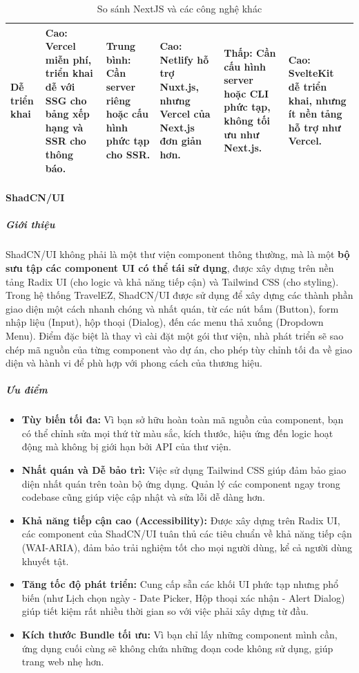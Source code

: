 \begin{landscape}
\begin{table}[h!]
\begin{tabularx}{\linewidth}{|l|X|X|X|X|X|}
\hline
\textbf{Dễ triển khai} & Cao: Vercel miễn phí, triển khai dễ với SSG cho bảng xếp hạng và SSR cho thông báo. & Trung bình: Cần server riêng hoặc cấu hình phức tạp cho SSR. & Cao: Netlify hỗ trợ Nuxt.js, nhưng Vercel của Next.js đơn giản hơn. & Thấp: Cần cấu hình server hoặc CLI phức tạp, không tối ưu như Next.js. & Cao: SvelteKit dễ triển khai, nhưng ít nền tảng hỗ trợ như Vercel. \\
\hline
\end{tabularx}
\caption{So sánh NextJS và các công nghệ khác}
\end{table}
\end{landscape}

\paragraph{ShadCN/UI}

\subparagraph{Giới thiệu}
ShadCN/UI không phải là một thư viện component thông thường, mà là một \textbf{bộ sưu tập các component UI có thể tái sử dụng}, được xây dựng trên nền tảng Radix UI (cho logic và khả năng tiếp cận) và Tailwind CSS (cho styling). Trong hệ thống TravelEZ, ShadCN/UI được sử dụng để xây dựng các thành phần giao diện một cách nhanh chóng và nhất quán, từ các nút bấm (Button), form nhập liệu (Input), hộp thoại (Dialog), đến các menu thả xuống (Dropdown Menu). Điểm đặc biệt là thay vì cài đặt một gói thư viện, nhà phát triển sẽ sao chép mã nguồn của từng component vào dự án, cho phép tùy chỉnh tối đa về giao diện và hành vi để phù hợp với phong cách của thương hiệu.

\subparagraph{Ưu điểm}
\begin{itemize}
    \item \textbf{Tùy biến tối đa:} Vì bạn sở hữu hoàn toàn mã nguồn của component, bạn có thể chỉnh sửa mọi thứ từ màu sắc, kích thước, hiệu ứng đến logic hoạt động mà không bị giới hạn bởi API của thư viện.
    \item \textbf{Nhất quán và Dễ bảo trì:} Việc sử dụng Tailwind CSS giúp đảm bảo giao diện nhất quán trên toàn bộ ứng dụng. Quản lý các component ngay trong codebase cũng giúp việc cập nhật và sửa lỗi dễ dàng hơn.
    \item \textbf{Khả năng tiếp cận cao (Accessibility):} Được xây dựng trên Radix UI, các component của ShadCN/UI tuân thủ các tiêu chuẩn về khả năng tiếp cận (WAI-ARIA), đảm bảo trải nghiệm tốt cho mọi người dùng, kể cả người dùng khuyết tật.
    \item \textbf{Tăng tốc độ phát triển:} Cung cấp sẵn các khối UI phức tạp nhưng phổ biến (như Lịch chọn ngày - Date Picker, Hộp thoại xác nhận - Alert Dialog) giúp tiết kiệm rất nhiều thời gian so với việc phải xây dựng từ đầu.
    \item \textbf{Kích thước Bundle tối ưu:} Vì bạn chỉ lấy những component mình cần, ứng dụng cuối cùng sẽ không chứa những đoạn code không sử dụng, giúp trang web nhẹ hơn.
\end{itemize}

